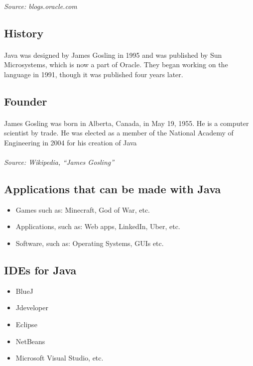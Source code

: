 \documentclass{article}
\begin{document}
	\paragraph{}\textit{Source: blogs.oracle.com}
	\subsection*{History}
	\paragraph{}Java was designed by James Gosling in 1995 and was published by Sun Microsystems, which is now a part of Oracle.
	They began working on the language in 1991, though it was published four years later.
	\subsection*{Founder}
	\paragraph{}James Gosling was born in Alberta, Canada, in May 19, 1955.
	He is a computer scientist by trade.
	He was elected as a member of the National Academy of Engineering in 2004 for his creation of Java
	\paragraph{}\textit{Source: Wikipedia, “James Gosling”}
	\subsection*{Applications that can be made with Java}
	\begin{itemize}
	\item Games such as: Minecraft, God of War, etc.
	\item Applications, such as: Web apps, LinkedIn, Uber, etc.
	\item Software, such as: Operating Systems, GUIs etc.
	\end{itemize}
	\subsection*{IDEs for Java}
	\begin{itemize}
	\item BlueJ
	\item Jdeveloper
	\item Eclipse
	\item NetBeans
	\item Microsoft Visual Studio, etc.
	\end{itemize}
\end{document}
